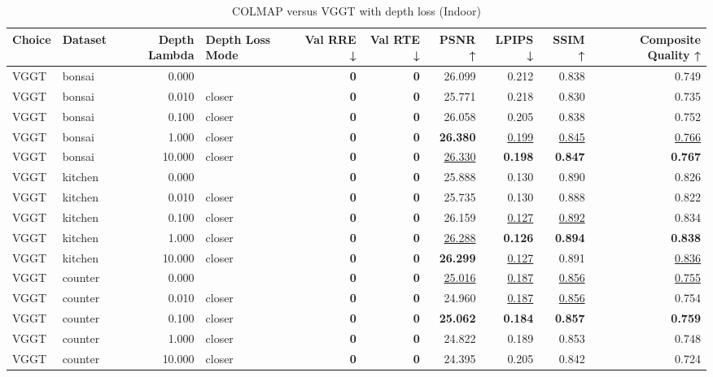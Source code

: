 \begin{table}[H]
\caption{COLMAP versus VGGT with depth loss (Indoor)}
\label{tab:05_depth_lambda_gt_cams_indoor}
\centering
\scriptsize
\begin{tabular}{llrlrrrrrr}
\toprule
Choice & Dataset & Depth Lambda & Depth Loss Mode & Val RRE ↓ & Val RTE ↓ & PSNR ↑ & LPIPS ↓ & SSIM ↑ & Composite Quality ↑ \\
\midrule
VGGT & bonsai & 0.000 &  & \textbf{0} & \textbf{0} & 26.099 & 0.212 & 0.838 & 0.749 \\
VGGT & bonsai & 0.010 & closer & \textbf{0} & \textbf{0} & 25.771 & 0.218 & 0.830 & 0.735 \\
VGGT & bonsai & 0.100 & closer & \textbf{0} & \textbf{0} & 26.058 & 0.205 & 0.838 & 0.752 \\
VGGT & bonsai & 1.000 & closer & \textbf{0} & \textbf{0} & \textbf{26.380} & \underline{0.199} & \underline{0.845} & \underline{0.766} \\
VGGT & bonsai & 10.000 & closer & \textbf{0} & \textbf{0} & \underline{26.330} & \textbf{0.198} & \textbf{0.847} & \textbf{0.767} \\
\midrule
VGGT & kitchen & 0.000 &  & \textbf{0} & \textbf{0} & 25.888 & 0.130 & 0.890 & 0.826 \\
VGGT & kitchen & 0.010 & closer & \textbf{0} & \textbf{0} & 25.735 & 0.130 & 0.888 & 0.822 \\
VGGT & kitchen & 0.100 & closer & \textbf{0} & \textbf{0} & 26.159 & \underline{0.127} & \underline{0.892} & 0.834 \\
VGGT & kitchen & 1.000 & closer & \textbf{0} & \textbf{0} & \underline{26.288} & \textbf{0.126} & \textbf{0.894} & \textbf{0.838} \\
VGGT & kitchen & 10.000 & closer & \textbf{0} & \textbf{0} & \textbf{26.299} & \underline{0.127} & 0.891 & \underline{0.836} \\
\midrule
VGGT & counter & 0.000 &  & \textbf{0} & \textbf{0} & \underline{25.016} & \underline{0.187} & \underline{0.856} & \underline{0.755} \\
VGGT & counter & 0.010 & closer & \textbf{0} & \textbf{0} & 24.960 & \underline{0.187} & \underline{0.856} & 0.754 \\
VGGT & counter & 0.100 & closer & \textbf{0} & \textbf{0} & \textbf{25.062} & \textbf{0.184} & \textbf{0.857} & \textbf{0.759} \\
VGGT & counter & 1.000 & closer & \textbf{0} & \textbf{0} & 24.822 & 0.189 & 0.853 & 0.748 \\
VGGT & counter & 10.000 & closer & \textbf{0} & \textbf{0} & 24.395 & 0.205 & 0.842 & 0.724 \\
\bottomrule
\end{tabular}
\end{table}